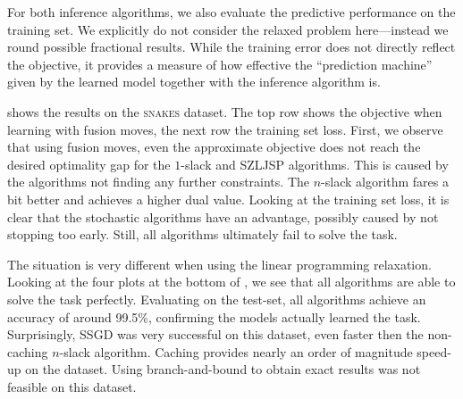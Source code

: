 For both inference algorithms, we also evaluate the predictive performance on
the training set.  We explicitly do not consider the relaxed problem
here---instead we round possible fractional results. While the training error
does not directly reflect the objective, it provides a measure of how effective
the ``prediction machine'' given by the learned model together with the
inference algorithm is.

 shows the results on the \textsc{snakes} dataset.
The top row shows the objective when learning with fusion moves, the next row
the training set loss.  First, we observe that using fusion moves, even the
approximate objective does not reach the desired optimality gap for the
$1$-slack and SZLJSP algorithms. This is caused by the algorithms not finding
any further constraints. The $n$-slack algorithm fares a bit better and
achieves a higher dual value. Looking at the training set loss, it is clear that the stochastic
algorithms have an advantage, possibly caused by not stopping too early.
Still, all algorithms ultimately fail to solve the task.

The situation is very different when using the linear programming relaxation.
Looking at the four plots at the bottom of , we see that all
algorithms are able to solve the task perfectly. Evaluating on the test-set, all algorithms
achieve an accuracy of around 99.5\%, confirming the models actually learned the task.
Surprisingly, SSGD was very successful on this dataset, even faster then the non-caching $n$-slack
algorithm. Caching provides nearly an order of magnitude speed-up on the dataset.
%
Using branch-and-bound to obtain exact results was not feasible on this dataset.

